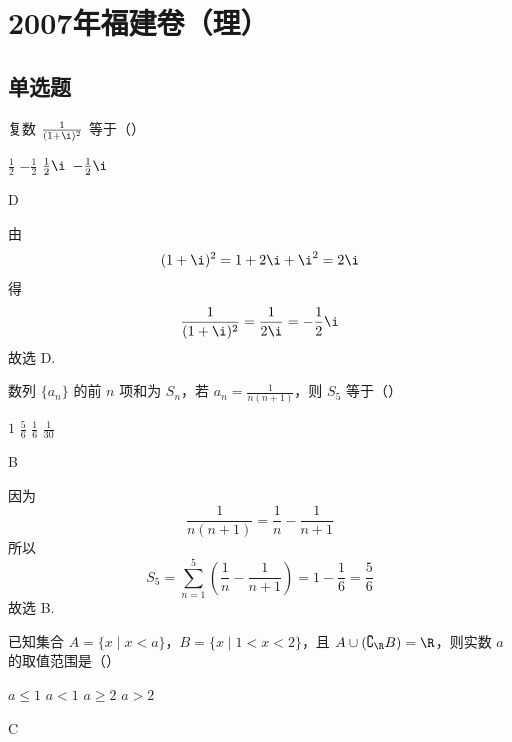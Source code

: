 \chapter{2007年福建卷（理）}

\section{单选题}

\begin{problem}
复数 \(\frac{1}{(1 + \i)^2}\) 等于（\quad）

\choices
    {\( \frac{1}{2} \)}
    {\( -\frac{1}{2} \)}
    {\(\frac{1}{2}\i\)}
    {\(-\frac{1}{2}\i\)}
\end{problem}

\begin{answer}
D
\end{answer}

\begin{solution}
由
\[
(1+\i)^2=1+2\i+\i^2=2\i
\]
得
\[
\frac{1}{(1+\i)^2}=\frac{1}{2\i}=-\frac{1}{2}\i
\]
故选 D.
\end{solution}

\begin{problem}
数列 \(\{a_{n}\}\) 的前 \(n\) 项和为 \(S_{n}\)，若 \(a_{n} = \frac{1}{n(n + 1)}\)，则 \(S_{5}\) 等于（\quad）

\choices
    {\(1\)}
    {\( \frac{5}{6} \)}
    {\( \frac{1}{6} \)}
    {\(\frac{1}{30}\)}
\end{problem}

\begin{answer}
B
\end{answer}

\begin{solution}
因为
\[
\frac{1}{n(n+1)}=\frac{1}{n}-\frac{1}{n+1}
\]
所以
\[
S_5=\sum_{n=1}^{5}\left(\frac{1}{n}-\frac{1}{n+1}\right)=1-\frac{1}{6}=\frac{5}{6}
\]
故选 B.
\end{solution}

\begin{problem}
已知集合 \(A = \{x \mid x < a\}\)，\(B = \{x \mid 1 < x < 2\}\)，且 \(A \cup (\complement_{\R} B) = \R\)，则实数 \(a\) 的取值范围是（\quad）

\choices
    {\(a \leqslant 1\)}
    {\(a < 1\)}
    {\(a \geqslant 2\)}
    {\(a > 2\)}
\end{problem}

\begin{answer}
C
\end{answer}

